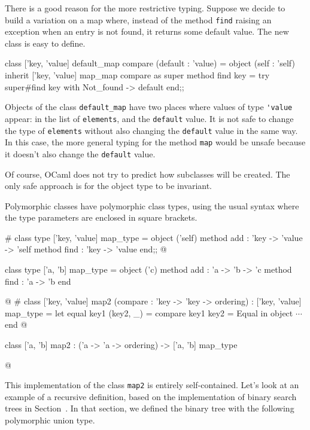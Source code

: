 There is a good reason for the more restrictive typing.  Suppose we
decide to build a variation on a map where, instead of the
method \hbox{\lstinline$find$} raising an exception when an entry is not
found, it returns some default value.  The new class is easy to
define.

\begin{ocaml}
class ['key, 'value] default_map compare (default : 'value) =
  object (self : 'self)
     inherit ['key, 'value] map_map compare as super
     method find key =
        try super#find key with
           Not_found -> default
  end;;
\end{ocaml}
%
Objects of the class \hbox{\lstinline$default_map$} have two places
where values of type \hbox{\lstinline$'value$} appear: in the list
of \hbox{\lstinline$elements$}, and the \hbox{\lstinline$default$}
value.  It is not safe to change the type
of \hbox{\lstinline$elements$} without also changing
the \hbox{\lstinline$default$} value in the same way.  In this case,
the more general typing for the method \lstinline$map$ would be unsafe
because it doesn't also change the \lstinline$default$ value.

Of course, OCaml does not try to predict how subclasses will be
created.  The only safe approach is for the object type to be
invariant.


Polymorphic classes have polymorphic class types, using the usual
syntax where the type parameters are enclosed in square brackets.

\begin{ocaml}
# class type ['key, 'value] map_type =
    object ('self)
      method add  : 'key -> 'value -> 'self
      method find : 'key -> 'value
    end;;
@
\begin{topoutput}
class type ['a, 'b] map_type =
  object ('c) method add : 'a -> 'b -> 'c method find : 'a -> 'b end
\end{topoutput}
@
# class ['key, 'value] map2 (compare : 'key -> 'key -> ordering)
  : ['key, 'value] map_type =
    let equal key1 (key2, _) = compare key1 key2 = Equal in
    object $\cdots$ end
@
\begin{topoutput}
class ['a, 'b] map2 : ('a -> 'a -> ordering) -> ['a, 'b] map_type
\end{topoutput}
@
\end{ocaml}
%
This implementation of the class \hbox{\lstinline$map2$} is entirely
self-contained.  Let's look at an example of a recursive definition,
based on the implementation of binary search trees in
Section~.  In that section, we defined
the binary tree with the following polymorphic union type.

